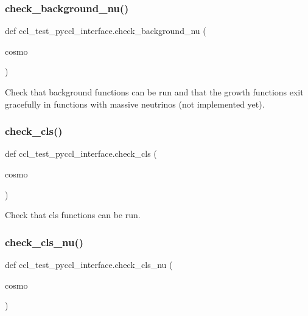 \subsubsection{\texorpdfstring{check\+\_\+background\+\_\+nu()}{check\_background\_nu()}}
{\footnotesize\ttfamily def ccl\+\_\+test\+\_\+pyccl\+\_\+interface.\+check\+\_\+background\+\_\+nu (\begin{DoxyParamCaption}\item[{}]{cosmo }\end{DoxyParamCaption})}

\begin{DoxyVerb}Check that background functions can be run and that the growth functions
exit gracefully in functions with massive neutrinos (not implemented yet).
\end{DoxyVerb}
 \mbox{\label{namespaceccl__test__pyccl__interface_a52b035753596952f1d3d265ad903dcb3}} 
\subsubsection{\texorpdfstring{check\+\_\+cls()}{check\_cls()}}
{\footnotesize\ttfamily def ccl\+\_\+test\+\_\+pyccl\+\_\+interface.\+check\+\_\+cls (\begin{DoxyParamCaption}\item[{}]{cosmo }\end{DoxyParamCaption})}

\begin{DoxyVerb}Check that cls functions can be run.
\end{DoxyVerb}
 \mbox{\label{namespaceccl__test__pyccl__interface_a1e444dede41317aa26bcdc16c0eaeb53}} 
\subsubsection{\texorpdfstring{check\+\_\+cls\+\_\+nu()}{check\_cls\_nu()}}
{\footnotesize\ttfamily def ccl\+\_\+test\+\_\+pyccl\+\_\+interface.\+check\+\_\+cls\+\_\+nu (\begin{DoxyParamCaption}\item[{}]{cosmo }\end{DoxyParamCaption})}

